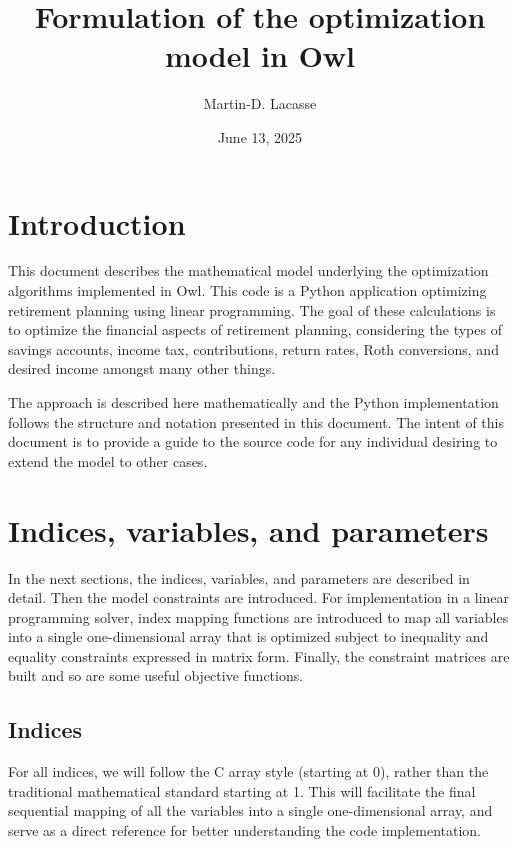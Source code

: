 \documentclass{report}[fleqn,12pt]
\begin{document}
\title{Formulation of the optimization model in Owl}
\author{Martin-D. Lacasse}
\date{June 13, 2025}
\maketitle
\thispagestyle{fancy}
\fancyhead{}

\chapter{Introduction}
This document describes the mathematical model underlying
the optimization algorithms implemented in
Owl. This code is a Python application optimizing retirement
planning using linear programming. The goal of
these calculations is to optimize the financial aspects
of retirement planning, considering the types of savings accounts,
income tax, contributions, return rates, Roth conversions,
and desired income amongst many other things.

The approach is described here mathematically and the Python implementation
follows the structure and notation presented in this document.
The intent of this document is to provide a guide to the source code
for any individual desiring to extend the model to other cases.

\chapter{Indices, variables, and parameters}
In the next sections, the indices, variables, and parameters are
described in detail. Then the model constraints are introduced.
For implementation in a linear programming solver, index mapping
functions are introduced to map all variables into a single
one-dimensional array that
is optimized subject to inequality and equality constraints
expressed in matrix form. Finally, the constraint matrices are built
and so are some useful objective functions.

\section{Indices}
For all indices, we will follow the C array style (starting at 0),
rather than the traditional mathematical standard starting at 1.
This will facilitate the final
sequential mapping of all the variables into a single one-dimensional array,
and serve as a direct reference for better understanding the code implementation.
\end{document}
